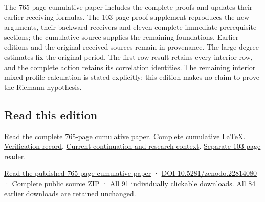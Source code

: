 \documentclass[
]{article}
\begin{document}
The 765-page cumulative paper includes the complete proofs and updates
their earlier receiving formulas. The 103-page proof supplement
reproduces the new arguments, their backward receivers and eleven
complete immediate prerequisite sections; the cumulative source supplies
the remaining foundations. Earlier editions and the original received
sources remain in provenance. The large-degree estimates fix the
original period. The first-row result retains every interior row, and
the complete action retains its correlation identities. The remaining
interior mixed-profile calculation is stated explicitly; this edition
makes no claim to prove the Riemann hypothesis.

\subsection{Read this edition}\label{read-this-edition-1}

\href{https://github.com/KokunoYumeto/zeta-function-research-reader/blob/main/workbenches/splitzero-tandem/continuations/20260917-original-period-mixed-profile/15_CURRENT_MIXED_CONTROL_READER.pdf}{Read
the complete 765-page cumulative paper}.
\href{https://github.com/KokunoYumeto/zeta-function-research-reader/blob/main/workbenches/splitzero-tandem/continuations/20260917-original-period-mixed-profile/14_CURRENT_KERNEL_AND_MULTIPLICITY_PROOFS.tex}{Complete
cumulative LaTeX}.
\href{https://github.com/KokunoYumeto/zeta-function-research-reader/blob/main/workbenches/splitzero-tandem/continuations/20260917-original-period-mixed-profile/12_VALIDATION.md}{Verification
record}.
\href{https://github.com/KokunoYumeto/zeta-function-research-reader/blob/main/workbenches/splitzero-tandem/continuations/20260917-original-period-mixed-profile/00_CONTINUE_HERE.md}{Current
continuation and research context}.
\href{https://github.com/KokunoYumeto/zeta-function-research-reader/blob/main/workbenches/splitzero-tandem/continuations/20260917-original-period-mixed-profile/MIXED_PROFILE_PROOF_SUPPLEMENT.pdf}{Separate
103-page reader}.

\href{https://zenodo.org/api/records/22814080/files/89-splitzero-original-period-mixed-profile-reader.pdf/content}{Read
the published 765-page cumulative paper} ·
\href{https://doi.org/10.5281/zenodo.22814080}{DOI
10.5281/zenodo.22814080} ·
\href{https://zenodo.org/api/records/22814080/files/90-splitzero-original-period-mixed-profile-sources.zip/content}{Complete
public source ZIP} ·
\href{https://github.com/KokunoYumeto/zeta-function-research-reader/blob/main/calculation_edition_20260917_original_period_mixed_profile/README.md}{All
91 individually clickable downloads}. All 84 earlier downloads are
retained unchanged.
\end{document}
